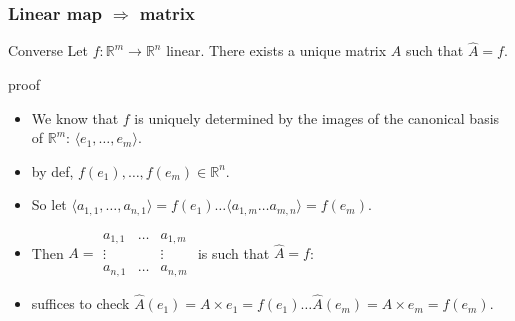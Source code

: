 \documentclass{beamer}
\begin{document}
\begin{frame}
  \frametitle{Linear map $\Rightarrow$ matrix}
  \begin{block}{Converse}
    Let $f : \mathbb{R}^m \rightarrow \mathbb{R}^n$ linear. There exists a unique matrix $A$ such that $\hat A = f$.
  \end{block}

  \begin{block}{proof}
    \begin{itemize}
    \item We know that $f$ is uniquely determined by the images of the canonical basis of $\mathbb{R}^m$: $\langle e_1, \dots, e_m \rangle$.
    \item by def, $f(e_1), \dots, f(e_m) \in \mathbb{R}^n$.
    \item So let $\langle a_{1,1}, \dots, a_{n,1} \rangle = f(e_1) \dots \langle a_{1, m} \dots a_{m, n} \rangle = f(e_m)$.
    \item Then $A = \begin{array}{|ccc|} a_{1,1} & \dots & a_{1,m}\\ \vdots & & \vdots\\ a_{n,1} & \dots & a_{n, m} \end{array}$ is such that $\hat A = f$:
    \item suffices to check $\hat A(e_1) = A \times e_1 = f(e_1) \dots \hat A(e_m) = A \times e_m = f(e_m)$.
    \end{itemize}
  \end{block}
  
\end{frame}
\end{document}
